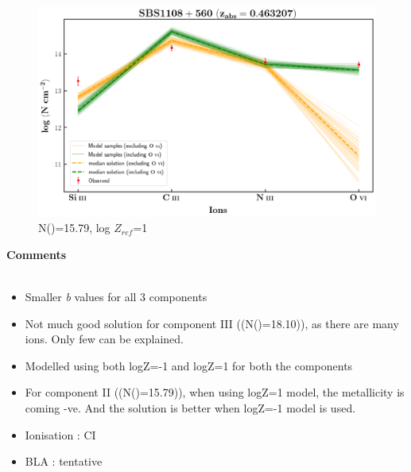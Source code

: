 \documentclass[12pt,draft]{report}
\newcommand\ion[2]{\text{#1\,\textsc{\lowercase{#2}}}}
\begin{document}
\begin{figure}[!b]
    \centering
    \includegraphics[width=0.85\linewidth]{Ionisation-Modelling-Plots/sbs1108-z=0.463207-compII_logZ=1.png}
    \caption{N(\ion{H}{i})=15.79, log $Z_{ref}$=1}
\end{figure}


\newpage

\textbf{Comments}
\\\\
\begin{itemize}
    \item Smaller \emph{b} values for all 3 components
    \item Not much good solution for component III ((N(\ion{H}{i})=18.10)), as there are many ions. Only few can be explained.
    \item Modelled using both logZ=-1 and logZ=1 for both the components
    \item For component II ((N(\ion{H}{i})=15.79)), when using logZ=1 model, the metallicity is coming -ve. And the solution is better when logZ=-1 model is used.
    \item Ionisation : CI
    \item BLA : tentative
\end{itemize}



\newpage
\end{document}
